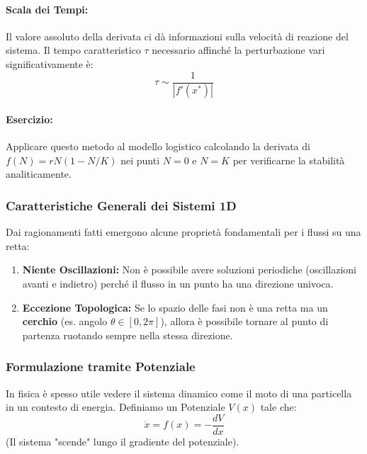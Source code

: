 \documentclass[openany]{book}
\theoremstyle{definition}
\theoremstyle{remark}
\begin{document}
\paragraph{Scala dei Tempi:}
Il valore assoluto della derivata ci dà informazioni sulla velocità di reazione del sistema. Il tempo caratteristico $\tau$ necessario affinché la perturbazione vari significativamente è:
\[ \tau \sim \frac{1}{|f'(x^*)|} \]

\paragraph{Esercizio:} Applicare questo metodo al modello logistico calcolando la derivata di $f(N) = rN(1 - N/K)$ nei punti $N=0$ e $N=K$ per verificarne la stabilità analiticamente.

\subsubsection*{Caratteristiche Generali dei Sistemi 1D}
Dai ragionamenti fatti emergono alcune proprietà fondamentali per i flussi su una retta:
\begin{enumerate}
    \item \textbf{Niente Oscillazioni:} Non è possibile avere soluzioni periodiche (oscillazioni avanti e indietro) perché il flusso in un punto ha una direzione univoca.
    \item \textbf{Eccezione Topologica:} Se lo spazio delle fasi non è una retta ma un \textbf{cerchio} (es. angolo $\theta \in [0, 2\pi]$), allora è possibile tornare al punto di partenza ruotando sempre nella stessa direzione.

\begin{center}
\end{center}
\end{enumerate}

\subsubsection*{Formulazione tramite Potenziale}
In fisica è spesso utile vedere il sistema dinamico come il moto di una particella in un contesto di energia. Definiamo un Potenziale $V(x)$ tale che:
\begin{equation}
    \dot{x} = f(x) = - \frac{dV}{dx}
\end{equation}
(Il sistema "scende" lungo il gradiente del potenziale).
\end{document}
